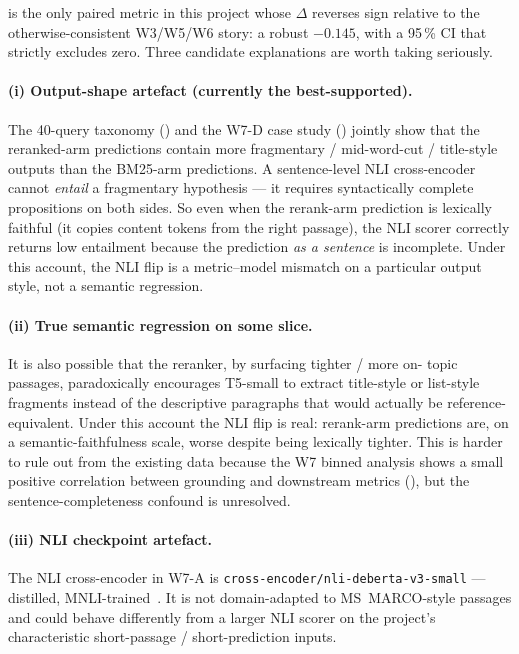 \documentclass[11pt,a4paper]{article}
\newcommand{\msmarco}{MS~MARCO}
\newcommand{\bmtwofive}{BM25}
\begin{document}
 is the only paired metric in this project whose
$\Delta$ reverses sign relative to the otherwise-consistent W3/W5/W6
story: a robust $-0.145$, with a 95\,\% CI that strictly excludes
zero.  Three candidate explanations are worth taking seriously.

\paragraph{(i) Output-shape artefact (currently the best-supported).}
The 40-query taxonomy () and the W7-D case
study () jointly show that the reranked-arm
predictions contain more fragmentary / mid-word-cut / title-style
outputs than the \bmtwofive{}-arm predictions.  A sentence-level
NLI cross-encoder cannot \emph{entail} a fragmentary hypothesis ---
it requires syntactically complete propositions on both sides.  So
even when the rerank-arm prediction is lexically faithful (it
copies content tokens from the right passage), the NLI scorer
correctly returns low entailment because the prediction \emph{as
a sentence} is incomplete.  Under this account, the NLI flip is a
metric--model mismatch on a particular output style, not a
semantic regression.

\paragraph{(ii) True semantic regression on some slice.}  It is
also possible that the reranker, by surfacing tighter / more on-
topic passages, paradoxically encourages T5-small to extract
title-style or list-style fragments instead of the descriptive
paragraphs that would actually be reference-equivalent.  Under this
account the NLI flip is real: rerank-arm predictions are, on a
semantic-faithfulness scale, worse despite being lexically tighter.
This is harder to rule out from the existing data because the W7
binned analysis shows a small positive correlation between
grounding and downstream metrics (), but the
sentence-completeness confound is unresolved.

\paragraph{(iii) NLI checkpoint artefact.}  The NLI cross-encoder
in W7-A is \texttt{cross-encoder/nli-deberta-v3-small} ---
distilled, MNLI-trained~\cite{he2023debertav3,williams2018mnli}.
It is not domain-adapted to \msmarco{}-style passages and could
behave differently from a larger NLI scorer on the project's
characteristic short-passage / short-prediction inputs.
\end{document}
